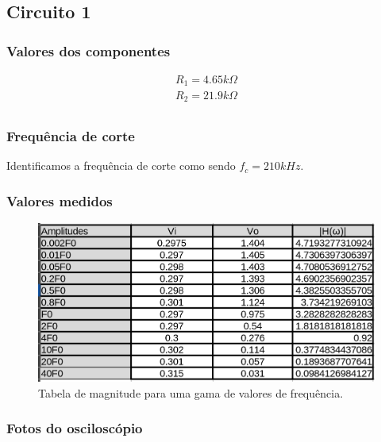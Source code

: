 \documentclass[12pt,twoside, a4paper, twocolumn]{article}
\begin{document}
\subsection{Circuito 1}


\subsubsection{Valores dos componentes}


\begin{equation}
    \begin{aligned}
        R_1 = 4.65k \varOmega \\
        R_2 = 21.9k \varOmega \\
    \end{aligned}
\end{equation}


\subsubsection{Frequência de corte}


Identificamos a frequência de corte como sendo $f_c = 210 kHz$.


\subsubsection{Valores medidos}


\begin{figure}[H]
    \centering
    \includegraphics[width=1\columnwidth]{images/valores1.png}
    \caption{Tabela de magnitude para uma gama de valores de frequência.}
\end{figure}


\subsubsection{Fotos do osciloscópio}
\end{document}
